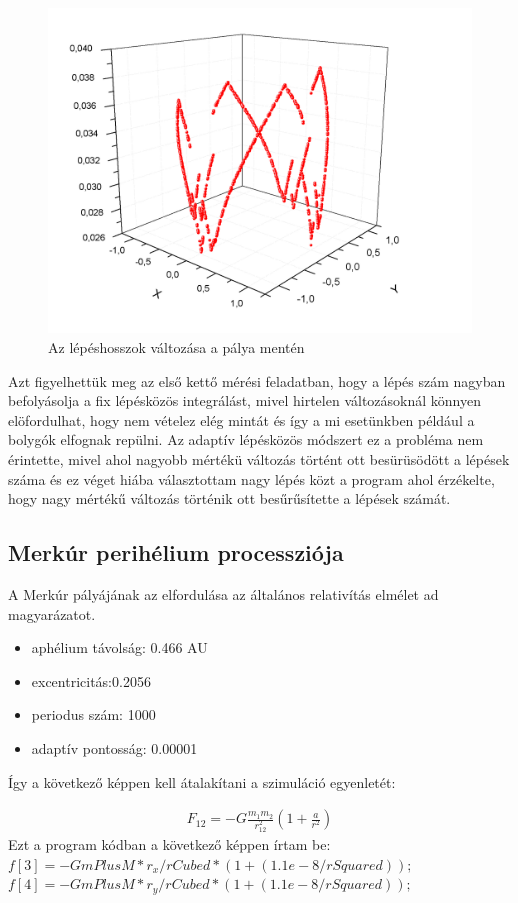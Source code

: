 \documentclass[paper=a4, fontsize=11pt]{article}
\begin{document}
\begin{figure}[H]
  \includegraphics[width=\textwidth]{lepes}
\caption{Az lépéshosszok változása a pálya mentén}
\end{figure}
Azt figyelhettük meg az első kettő mérési feladatban, hogy a lépés szám nagyban befolyásolja a fix lépésközös integrálást, mivel hirtelen változásoknál könnyen elöfordulhat, hogy nem vételez elég mintát és így a mi esetünkben például a bolygók elfognak repülni. Az adaptív lépésközös módszert ez a probléma nem érintette, mivel ahol nagyobb mértékü változás történt ott besürüsödött a lépések száma és ez véget hiába választottam nagy lépés közt a program ahol érzékelte, hogy nagy mértékű változás történik ott besűrűsítette a lépések számát. 

\subsection{Merkúr perihélium processziója}
A Merkúr pályájának az elfordulása az általános relativítás elmélet ad magyarázatot. 
\begin{itemize}
  \item aphélium távolság: 0.466 AU
  \item excentricitás:0.2056
  \item periodus szám: 1000
  \item adaptív pontosság: 0.00001
\end{itemize}

Így a következő képpen kell átalakítani a szimuláció egyenletét:

\begin{align}
F_{12}=-G\frac{m_1m_2}{r_{12}^2}(1+\frac{a}{r^2})
\end{align}
Ezt a program kódban a következő képpen írtam be:
\newline
$f[3] = - GmPlusM * r _ x / rCubed*(1 + (1.1e-8/rSquared));$
\newline
$f[4] = - GmPlusM *  r _ y / rCubed*(1 + (1.1e-8/rSquared));$
 \newline
\end{document}
